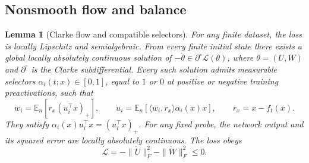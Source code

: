 \documentclass[10pt]{article}
\newtheorem{lemma}[theorem]{Lemma}
\theoremstyle{remark}\newtheorem{remark}[theorem]{Remark}
\begin{document}
\subsection{Nonsmooth flow and balance}
\begin{lemma}[Clarke flow and compatible selectors]\label{lem:gf-regularity}
For any finite dataset, the loss is locally Lipschitz and semialgebraic.
From every finite initial state there exists a global locally absolutely
continuous solution of $-\dot\theta\in\partial^\circ\mathcal L(\theta)$,
where $\theta=(U,W)$ and $\partial^\circ$ is the Clarke subdifferential.
Every such solution admits measurable selectors $\alpha_i(t;x)\in[0,1]$,
equal to $1$ or $0$ at positive or negative training preactivations, such that
\begin{equation}\label{eq:flow}
 \dot w_i=\mathbb E_n[r_x(u_i^\top x)_+],\qquad
 \dot u_i=\mathbb E_n[\langle w_i,r_x\rangle\alpha_i(x)x],
 \qquad r_x=x-f_t(x).
\end{equation}
They satisfy $\alpha_i(x)u_i^\top x=(u_i^\top x)_+$.
For any fixed probe, the network output and its squared error are locally
absolutely continuous. The loss obeys
\begin{equation}\label{eq:dissipation}
 \dot{\mathcal L}=-\|\dot U\|_F^2-\|\dot W\|_F^2\le0.
\end{equation}
\end{lemma}
\end{document}
